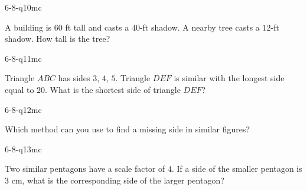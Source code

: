 \begin{practiceQuestion}{6-8-q10}{mc}
\begin{questionText}
A building is $60$ ft tall and casts a $40$-ft shadow. A nearby tree casts a $12$-ft shadow. How tall is the tree?
\end{questionText}
\end{practiceQuestion}

\begin{practiceQuestion}{6-8-q11}{mc}
\begin{questionText}
Triangle $ABC$ has sides $3$, $4$, $5$. Triangle $DEF$ is similar with the longest side equal to $20$. What is the shortest side of triangle $DEF$?
\end{questionText}
\end{practiceQuestion}

\begin{practiceQuestion}{6-8-q12}{mc}
\begin{questionText}
Which method can you use to find a missing side in similar figures?
\end{questionText}
\end{practiceQuestion}

\begin{practiceQuestion}{6-8-q13}{mc}
\begin{questionText}
Two similar pentagons have a scale factor of $4$. If a side of the smaller pentagon is $3$ cm, what is the corresponding side of the larger pentagon?
\end{questionText}
\end{practiceQuestion}

